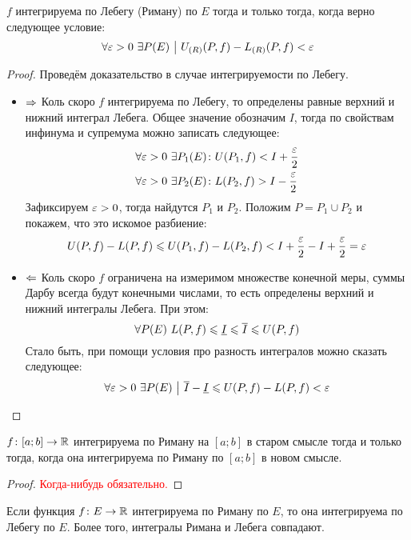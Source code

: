 \begin{proposition} \label{commonEquivLebeg}
	$f$ интегрируема по Лебегу (Риману) по $E$ тогда и только тогда, когда верно следующее условие:
	\[
		\forall \varepsilon > 0\ \exists P(E) \ \big|\  U_{(R)}(P, f) - L_{(R)}(P, f) < \varepsilon
	\]
\end{proposition}

\begin{proof}
	Проведём доказательство в случае интегрируемости по Лебегу.
	\begin{itemize}
		\item $\Rightarrow$ Коль скоро $f$ интегрируема по Лебегу, то определены равные верхний и нижний интеграл Лебега. Общее значение обозначим $I$, тогда по свойствам инфинума и супремума можно записать следующее:
		\begin{align*}
			&{\forall \varepsilon > 0\ \exists P_1(E) \colon U(P_1, f) < I + \frac{\varepsilon}{2}}
			\\
			&{\forall \varepsilon > 0\ \exists P_2(E) \colon L(P_2, f) > I - \frac{\varepsilon}{2}}
		\end{align*}
		Зафиксируем $\varepsilon > 0$, тогда найдутся $P_1$ и $P_2$. Положим $P = P_1 \cup P_2$ и покажем, что это искомое разбиение:
		\[
			U(P, f) - L(P, f) \leqslant U(P_1, f) - L(P_2, f) < I + \frac{\varepsilon}{2} - I + \frac{\varepsilon}{2} = \varepsilon
		\]
		
		\item $\Leftarrow$ Коль скоро $f$ ограничена на измеримом множестве конечной меры, суммы Дарбу всегда будут конечными числами, то есть определены верхний и нижний интегралы Лебега. При этом:
		\[
			\forall P(E)\ L(P, f) \leqslant \underline{I} \leqslant \overline{I} \leqslant U(P, f)
		\]
		Стало быть, при помощи условия про разность интегралов можно сказать следующее:
		\[
			\forall \varepsilon > 0\ \exists P(E) \ \big|\  \overline{I} - \underline{I} \leqslant U(P, f) - L(P, f) < \varepsilon
		\]
	\end{itemize}
\end{proof}

\begin{proposition}
	$f \colon [a; b] \to \mathbb{R}$ интегрируема по Риману на $[a; b]$ в старом смысле тогда и только тогда, когда она интегрируема по Риману по $[a; b]$ в новом смысле.
\end{proposition}

\begin{proof}
	\textcolor{red}{Когда-нибудь обязательно.}
\end{proof}

\begin{proposition}
	Если функция $f \colon E \to \mathbb{R}$ интегрируема по Риману по $E$, то она интегрируема по Лебегу по $E$. Более того, интегралы Римана и Лебега совпадают.
\end{proposition}


